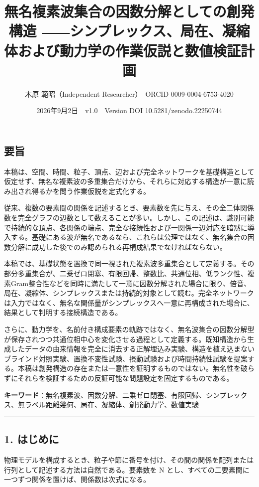 \documentclass[
  a4paper,
]{ltjsarticle}
\title{無名複素波集合の因数分解としての創発構造
――シンプレックス、局在、凝縮体および動力学の作業仮説と数値検証計画}
\author{木原 範昭（Independent Researcher）　ORCID 0009-0004-6753-4020}
\date{2026年9月2日　v1.0　Version DOI 10.5281/zenodo.22250744}
\begin{document}
\maketitle

\subsection{要旨}\label{ux8981ux65e8}

本稿は、空間、時間、粒子、頂点、辺および完全ネットワークを基礎構造として仮定せず、無名な複素波の多重集合だけから、それらに対応する構造が一意に読み出され得るかを問う作業仮説を定式化する。

従来、複数の要素間の関係を記述するとき、要素数を先に与え、その全二体関係数を完全グラフの辺数として数えることが多い。しかし、この記述は、識別可能で持続的な頂点、各関係の端点、完全な接続性および一関係一辺対応を暗黙に導入する。基礎にある波が無名であるなら、これらは公理ではなく、無名集合の因数分解に成功した後でのみ認められる再構成結果でなければならない。

本稿では、基礎状態を置換で同一視された複素波多重集合として定義する。その部分多重集合が、二乗ゼロ閉塞、有限回帰、整数比、共通位相、低ランク性、複素Gram整合性などを同時に満たして一意に因数分解された場合に限り、倍音、局在、凝縮体、シンプレックスまたは持続的対象として読む。完全ネットワークは入力ではなく、無名な関係量がシンプレックスへ一意に再構成された場合に、結果として判明する接続構造である。

さらに、動力学を、名前付き構成要素の軌跡ではなく、無名波集合の因数分解型が保存されつつ共通位相中心を変化させる過程として定義する。既知構造から生成したデータの由来情報を完全に消去する正解埋込み実験、構造を植え込まないブラインド対照実験、置換不変性試験、摂動試験および時間持続性試験を提案する。本稿は創発構造の存在または一意性を証明するものではない。無名性を破らずにそれらを検証するための反証可能な問題設定を固定するものである。

\textbf{キーワード}：無名複素波、因数分解、二乗ゼロ閉塞、有限回帰、シンプレックス、無ラベル距離幾何、局在、凝縮体、創発動力学、数値実験

\begin{center}\rule{0.5\linewidth}{0.5pt}\end{center}

\subsection{1. はじめに}\label{ux306fux3058ux3081ux306b}

物理モデルを構成するとき、粒子や節に番号を付け、その間の関係を配列または行列として記述する方法は自然である。要素数を
N とし、すべての二要素間に一つずつ関係を置けば、関係数は次式になる。
\end{document}
